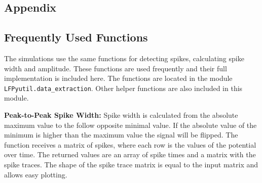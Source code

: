 \documentclass[altfont, fleqn]{uiophd}
\begin{document}
\printbibliography[heading=bibintoc]
\begin{appendices}
\chapter{Appendix}
\startcontents
{}
\section{Frequently Used Functions}
\label{sec:frequent_functions}
The simulations use the same functions for 
detecting spikes, 
calculating spike
width and amplitude. 
These functions are used frequently and 
their full implementation is included here. 
The functions are located in the module 
\verb+LFPyutil.data_extraction+.
Other helper functions are also included in this module.
\newline

\noindent
\textbf{Peak-to-Peak Spike Width:}
Spike width is calculated from the absolute maximum value to
the follow opposite minimal value. 
If the absolute value of the minimum is higher than the maximum
value the signal will be flipped. 
The function receives a matrix of spikes, 
where each row is the values of the potential
over time. 
The returned values are an array of spike times
and a matrix with the spike traces. 
The shape of the spike trace matrix is
equal to the input matrix and allows easy plotting. 
\newline

\end{appendices}
\end{document}

